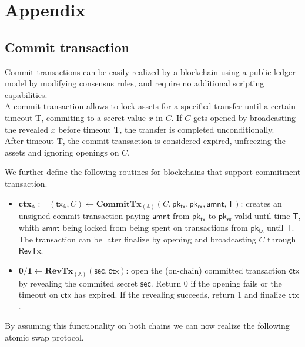 \documentclass{article}      	%
\begin{document}
\printbibliography

\newpage
\appendix

\section*{Appendix}
\subsection*{Commit transaction}

Commit transactions can be easily realized by a blockchain using a public ledger model by modifying consensus rules, and require no additional scripting capabilities.  \\
A commit transaction allows to lock assets for a specified transfer until a certain timeout T, commiting to a secret value $x$ in $C$. If $C$ gets opened by broadcasting the revealed $x$ before timeout T, the transfer is completed unconditionally. \\ 
After timeout T, the commit transaction is considered expired, unfreezing the assets and ignoring openings on $C$.

We further define the following routines for blockchains that support commitment transaction.
\begin{itemize}[topsep=0pt, itemsep=0pt, leftmargin=2em]
	\item $\mathbf{ctx}_{\mathbb{A}} := (\mathsf{tx_{\mathbb{A}}}, C) \gets \mathbf{CommitTx}_{(\mathbb{A})}(C, \mathsf{pk_{tx}}, \mathsf{pk_{rx}}, \mathsf{amnt}, \mathsf{T})$: creates an unsigned commit transaction paying $\mathsf{amnt}$ from $\mathsf{pk_{tx}}$ to $\mathsf{pk_{rx}}$ valid until time $\mathsf{T}$, whith  $\mathsf{amnt}$ being locked from being spent on transactions from $\mathsf{pk_{tx}}$ until $\mathsf{T}$. The transaction can be later finalize by opening and broadcasting $C$ through $\mathsf{RevTx}$.
\item $ \mathbf{0/1} \gets \mathbf{RevTx}_{(\mathbb{A})}(\mathsf{sec}, \mathsf{ctx})$: open the (on-chain) committed transaction $\mathsf{ctx}$ by revealing the commited secret $\mathsf{sec}$. Return 0 if the opening fails or the timeout on $\mathsf{ctx}$ has expired. If the revealing succeeds, return 1 and finalize $\mathsf{ctx}$.
\end{itemize}

By assuming this functionality on both chains we can now realize the following atomic swap protocol.
\end{document}
